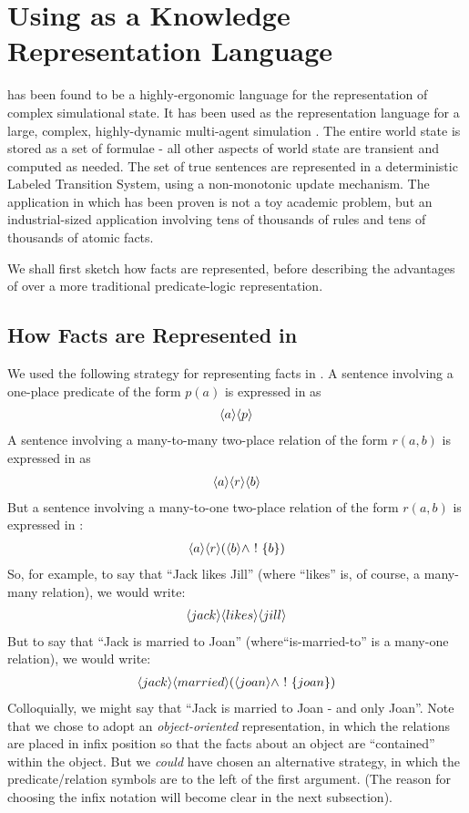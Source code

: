 \section{Using \ELFULL{} as a Knowledge Representation Language}\label{kr}

\ELFULL{} has been found to be a highly-ergonomic language for the
representation of complex simulational state.  It has been used as the
representation language for a large, complex, highly-dynamic
multi-agent simulation \cite{evans-and-short}.  The entire world state
is stored as a set of formulae - all other aspects of world state are
transient and computed as needed.  The set of true sentences are represented in a deterministic Labeled Transition System, using a non-monotonic update mechanism.  The application in which \ELABR{} has been
proven is not a toy academic problem, but an industrial-sized
application involving tens of thousands of rules and tens of thousands
of atomic facts.

We shall first sketch how facts are represented, before describing the advantages of \ELABR{} over a more traditional predicate-logic representation.

\subsection{How Facts are Represented in \ELABR{}}

We used the following strategy for representing facts in \ELABR{}.
A sentence involving a one-place predicate of the form $p(a)$ is expressed in \ELABR{} as 
\begin{eqnarray*}
\langle a \rangle \langle p \rangle \end{eqnarray*}
A sentence involving a many-to-many two-place relation of the form $r(a,b)$ is expressed in \ELABR{} as
\begin{eqnarray*}
\langle a \rangle \langle r \rangle \langle b \rangle \end{eqnarray*}
But a sentence involving a many-to-one two-place relation of the form $r(a,b)$ is expressed in \ELABR{}:
\begin{eqnarray*}
\langle a \rangle \langle r \rangle (\langle b \rangle \land \ ! \  \{b\})
\end{eqnarray*}
So, for example, to say that ``Jack likes Jill'' (where ``likes'' is, of course, a many-many relation), we would write:
\begin{eqnarray*}
\langle jack \rangle \langle likes \rangle \langle jill \rangle \end{eqnarray*}
But to say that ``Jack is married to Joan'' (where``is-married-to'' is a many-one relation), we would write:
\begin{eqnarray*}
\langle jack \rangle \langle married \rangle (\langle joan \rangle \land \ ! \  \{joan\})
\end{eqnarray*}
Colloquially, we might say that ``Jack is married to Joan - and only Joan''.
Note that we chose to adopt an \emph{object-oriented} representation, in which the relations are placed in infix position so that the facts about an object are ``contained'' within the object.
But we \emph{could} have chosen an alternative strategy, in which the predicate/relation symbols are to the left of the first argument. (The reason for choosing the infix notation will become clear in the next subsection).

